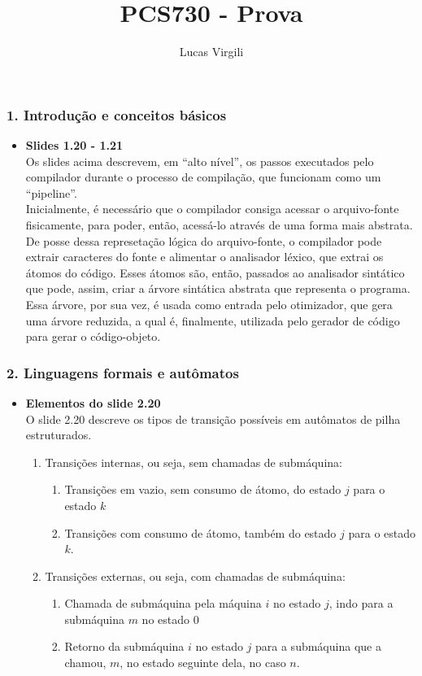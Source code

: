 \documentclass{beamer}
\title{PCS730 - Prova}
\author{Lucas Virgili}
\date{}
\begin{document}
\begin{frame}[fragile]
  \titlepage
\end{frame}


\begin{frame}[fragile]
  \frametitle{1. Introdu\c c\~ao e conceitos b\'asicos}
  \begin{itemize}
  \item \textbf{Slides 1.20 - 1.21}\\
    Os slides acima descrevem, em ``alto n\'ivel'', os passos
    executados pelo compilador durante o processo de compila\c c\~ao,
    que funcionam como um ``pipeline''.\\

    Inicialmente, \'e necess\'ario que o compilador consiga acessar o
    arquivo-fonte fisicamente, para poder, ent\~ao, acess\'a-lo
    atrav\'es de uma forma mais abstrata. De posse dessa represeta\c
    c\~ao l\'ogica do arquivo-fonte, o compilador pode extrair
    caracteres do fonte e alimentar o analisador l\'exico, que extrai
    os \'atomos do c\'odigo. Esses \'atomos s\~ao, ent\~ao, passados
    ao analisador sint\'atico que pode, assim, criar a \'arvore
    sint\'atica abstrata que representa o programa. Essa \'arvore, por
    sua vez, \'e usada como entrada pelo otimizador, que gera uma
    \'arvore reduzida, a qual \'e, finalmente, utilizada pelo gerador
    de c\'odigo para gerar o c\'odigo-objeto.
  \end{itemize}
\end{frame}

\begin{frame}[fragile]
  \frametitle{2. Linguagens formais e aut\^omatos}
  \begin{itemize}
  \item \textbf{Elementos do slide 2.20}\\
    O slide 2.20 descreve os tipos de transi\c c\~ao poss\'iveis em
    aut\^omatos de pilha estruturados.
    \begin{enumerate}
    \item Transi\c c\~oes internas, ou seja, sem chamadas de subm\'aquina:
      \begin{enumerate}
      \item Transi\c c\~oes em vazio, sem consumo de \'atomo, do
        estado $j$ para o estado $k$
      \item Transi\c c\~oes com consumo de \'atomo, tamb\'em do estado
        $j$ para o estado $k$.
      \end{enumerate}
    \item Transi\c c\~oes externas, ou seja, com chamadas de
      subm\'aquina:
      \begin{enumerate}
      \item Chamada de subm\'aquina pela m\'aquina $i$ no estado $j$,
        indo para a subm\'aquina $m$ no estado $0$
      \item Retorno da subm\'aquina $i$ no estado $j$ para a
        subm\'aquina que a chamou, $m$, no estado seguinte dela, no
        caso $n$.
      \end{enumerate}
    \end{enumerate}
  \end{itemize}
\end{frame}
\end{document}
